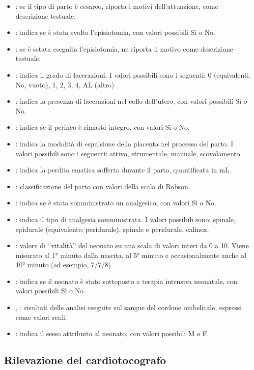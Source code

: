 \begin{itemize}
\item {}: se il tipo di parto è cesareo, riporta i motivi dell'attuazione, come descrizione testuale.
\item {}: indica se è stata svolta l'episiotomia, con valori possibili Sì o No.
\item {}: se è sstata eseguita l'episiotomia, ne riporta il motivo come descrizione testuale.
\item {}: indica il grado di lacerazioni. I valori possibili sono i seguenti: 0 (equivalenti: No, vuoto), 1, 2, 3, 4, AL (altro) 
\item {}: indica la presenza di lacerazioni nel collo dell'utero, con valori possibili Sì o No.
\item {}: indica se il perineo è rimasto integro, con valori Sì o No.
\item {}: indica la modalità di espulsione della placenta nel processo del parto. I valori possibili sono i seguenti: attivo, strumentale, manuale, scovolamento.
\item {}: indica la perdita ematica sofferta durante il parto, quantificata in mL.
\item {}: classificazione del parto con valori della scala di Robson.
\item {}: indica se è stata somministrato un analgesico, con valori Sì o No.
\item {}: indica il tipo di analgesia somministrata. I valori possibili sono: spinale, epidurale (equivalente: peridurale), spinale e peridurale, calinox.
\item {}: valore di \enquote{vitalità} del neonato su una scala di valori interi da 0 a 10. Viene misurato al 1° minuto dalla nascita, al 5° minuto e occasionalmente anche al 10° minuto (ad esempio, 7/7/8).
\item {}: indica se il neonato è stato sottoposto a terapia intensiva neonatale, con valori possibili Sì o No.
\item {}, : risultati delle analisi eseguite sul sangue del cordone ombelicale, espressi come valori reali.
\item {}: indica il sesso attribuito al neonato, con valori possibili M o F.
\end{itemize}

\subsection{Rilevazione del cardiotocografo}
\label{cardiotocograph}

